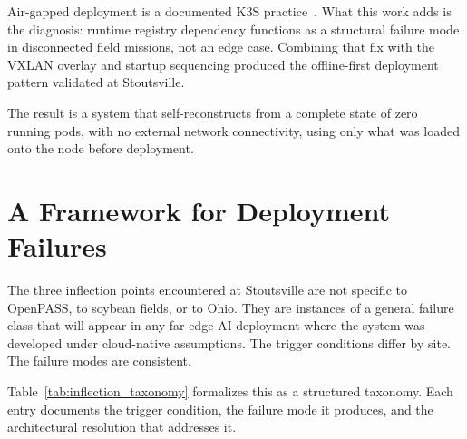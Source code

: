 Air-gapped deployment is a documented K3S practice~\cite{k3sdocs2024}. What this work adds is the diagnosis: runtime registry dependency functions as a structural failure mode in disconnected field missions, not an edge case. Combining that fix with the VXLAN overlay and startup sequencing produced the offline-first deployment pattern validated at Stoutsville.

The result is a system that self-reconstructs from a complete state of zero running pods, with no external network connectivity, using only what was loaded onto the node before deployment.

\section{A Framework for Deployment Failures}
\label{sec:ch3_framework}
The three inflection points encountered at Stoutsville are not specific to OpenPASS, to soybean fields, or to Ohio. They are instances of a general failure class that will appear in any far-edge AI deployment where the system was developed under cloud-native assumptions. The trigger conditions differ by site. The failure modes are consistent.

Table~\ref{tab:inflection_taxonomy} formalizes this as a structured taxonomy. Each entry documents the trigger condition, the failure mode it produces, and the architectural resolution that addresses it.



